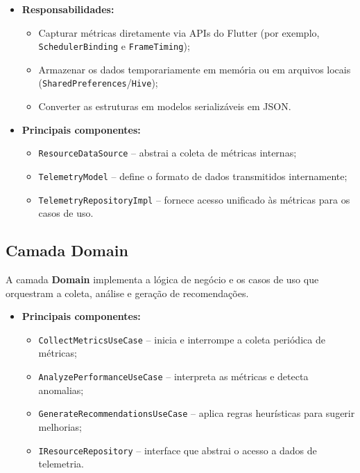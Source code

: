 \documentclass[12pt,a4paper,oneside]{abntex2}
\begin{document}
\begin{itemize}
  \item \textbf{Responsabilidades:}
    \begin{itemize}
      \item Capturar métricas diretamente via APIs do Flutter (por exemplo, \texttt{SchedulerBinding} e \texttt{FrameTiming});
      \item Armazenar os dados temporariamente em memória ou em arquivos locais (\texttt{SharedPreferences}/\texttt{Hive});
      \item Converter as estruturas em modelos serializáveis em JSON.
    \end{itemize}
  \item \textbf{Principais componentes:}
    \begin{itemize}
      \item \texttt{ResourceDataSource} – abstrai a coleta de métricas internas;
      \item \texttt{TelemetryModel} – define o formato de dados transmitidos internamente;
      \item \texttt{TelemetryRepositoryImpl} – fornece acesso unificado às métricas para os casos de uso.
    \end{itemize}
\end{itemize}

\subsection{Camada Domain}

A camada \textbf{Domain} implementa a lógica de negócio e os casos de uso que orquestram a coleta, análise e geração de recomendações.

\begin{itemize}
  \item \textbf{Principais componentes:}
    \begin{itemize}
      \item \texttt{CollectMetricsUseCase} – inicia e interrompe a coleta periódica de métricas;
      \item \texttt{AnalyzePerformanceUseCase} – interpreta as métricas e detecta anomalias;
      \item \texttt{GenerateRecommendationsUseCase} – aplica regras heurísticas para sugerir melhorias;
      \item \texttt{IResourceRepository} – interface que abstrai o acesso a dados de telemetria.
    \end{itemize}
\end{itemize}
\end{document}
